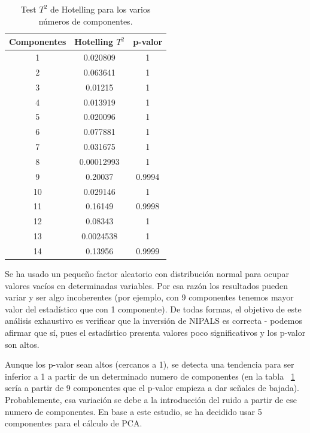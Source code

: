 \documentclass[11pt,spanish,listoffigures,listoftables]{tfgetsinf}
\begin{document}
    \begin{table}
         \centering
         \begin{tabular}{|c|c|c|} 
             \hline
             Componentes & Hotelling \(T^2\) & p-valor \\ [0.5ex] 
             \hline\hline
             1 & 0.020809 & 1 \\ 
             \hline
             2 & 0.063641 & 1 \\ 
             \hline
             3 & 0.01215 & 1 \\ 
             \hline
             4 & 0.013919 & 1 \\ 
             \hline
             5 & 0.020096 & 1 \\ 
             \hline
             6 & 0.077881 & 1 \\ 
             \hline
             7 & 0.031675 & 1 \\ 
             \hline
             8 & 0.00012993 & 1 \\ 
             \hline
             9 & 0.20037 & 0.9994 \\ 
             \hline
             10 & 0.029146 & 1 \\ 
             \hline
             11 & 0.16149 & 0.9998 \\ 
             \hline
             12 & 0.08343 & 1 \\ 
             \hline
             13 & 0.0024538 & 1 \\ 
             \hline
             14 & 0.13956 & 0.9999 \\ 
             \hline
        \end{tabular}
        \caption{Test \(T^2\) de Hotelling para los varios números de componentes.}
        \label{table:t2_test}
    \end{table}
    
    Se ha usado un pequeño factor aleatorio con distribución normal para ocupar valores vacíos en determinadas variables. Por esa razón los resultados pueden variar y ser algo incoherentes (por ejemplo, con 9 componentes tenemos mayor valor del estadístico que con 1 componente). De todas formas, el objetivo de este análisis exhaustivo es verificar que la inversión de NIPALS es correcta - podemos afirmar que sí, pues el estadístico presenta valores poco significativos y los p-valor son altos.
    
    Aunque los p-valor sean altos (cercanos a 1), se detecta una tendencia para ser inferior a 1 a partir de un determinado numero de componentes (en la tabla ~\ref{table:t2_test} sería a partir de 9 componentes que el p-valor empieza a dar señales de bajada). Probablemente, esa variación se debe a la introducción del ruido a partir de ese numero de componentes. En base a este estudio, se ha decidido usar 5 componentes para el cálculo de PCA.
\end{document}
